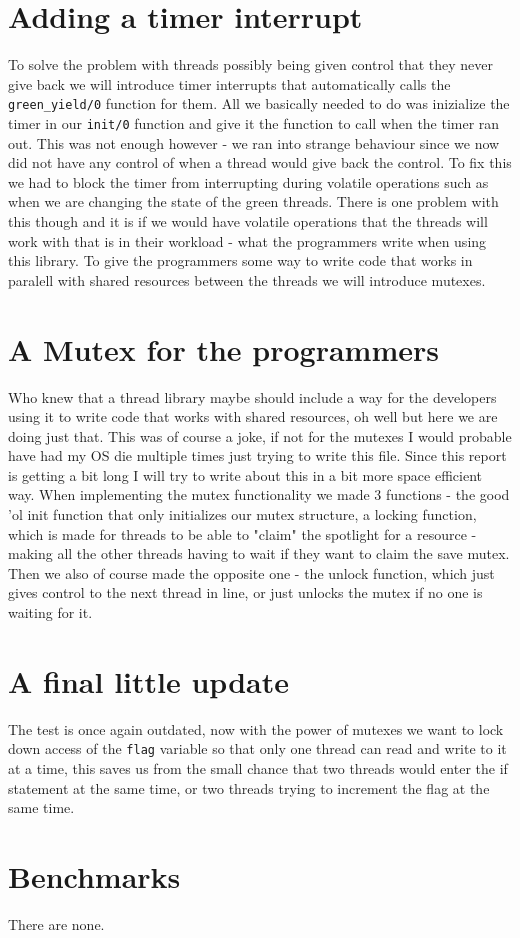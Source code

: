\documentclass[a4paper, 12pt]{article}
\def\code#1{\texttt{#1}}
\begin{document}
\section{Adding a timer interrupt}
To solve the problem with threads possibly being given control that they never give back we will introduce timer interrupts that automatically calls the \code{green\_yield/0} function for them.
All we basically needed to do was inizialize the timer in our \code{init/0} function and give it the function to call when the timer ran out. This was not enough however - we ran into strange behaviour since we now did not have any control of when a thread would give back the control. To fix this we had to block the timer from interrupting during volatile operations such as when we are changing the state of the green threads. There is one problem with this though and it is if we would have volatile operations that the threads will work with that is in their workload - what the programmers write when using this library. To give the programmers some way to write code that works in paralell with shared resources between the threads we will introduce mutexes.

\section{A Mutex for the programmers}
Who knew that a thread library maybe should include a way for the developers using it to write code that works with shared resources, oh well but here we are doing just that. This was of course a joke, if not for the mutexes I would probable have had my OS die multiple times just trying to write this file. Since this report is getting a bit long I will try to write about this in a bit more space efficient way. When implementing the mutex functionality we made 3 functions - the good 'ol init function that only initializes our mutex structure, a locking function, which is made for threads to be able to "claim" the spotlight for a resource - making all the other threads having to wait if they want to claim the save mutex. Then we also of course made the opposite one - the unlock function, which just gives control to the next thread in line, or just unlocks the mutex if no one is waiting for it.

\section{A final little update}
The test is once again outdated, now with the power of mutexes we want to lock down access of the \code{flag} variable so that only one thread can read and write to it at a time, this saves us from the small chance that two threads would enter the if statement at the same time, or two threads trying to increment the flag at the same time.

\section{Benchmarks}
There are none.


\end{document}
